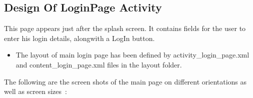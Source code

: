 \documentclass{article}
\begin{document}

\subsection{Design Of LoginPage Activity}
\par\noindent This page appears just after the splash screen. It contains fields for the user to enter his login details, alongwith a LogIn button.
\begin{itemize}
\item The layout of main login page has been defined by activity\_login\_page.xml and content\_login\_page.xml files in the layout folder.

\end{itemize} 

\par\noindent The following are the screen shots of the main page on different orientations as well as screen sizes~\cite{figures_in_latex}:


\end{document}
